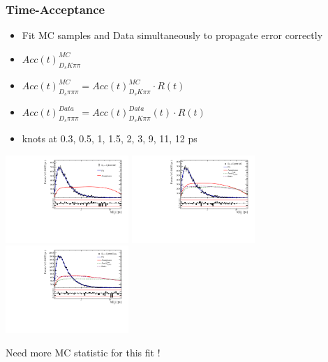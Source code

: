 \documentclass[]{beamer}
\begin{document}
\begin{frame}
\frametitle{Time-Acceptance}

\centering

\begin{itemize}
	\item Fit MC samples and Data simultaneously to propagate error correctly
	\item $Acc(t)_{D_{s}K\pi\pi}^{MC}$
	\item $Acc(t)_{D_{s}\pi\pi\pi}^{MC} = Acc(t)^{MC}_{D_{s}K\pi\pi} \cdot R(t) $
	\item $Acc(t)_{D_{s}\pi\pi\pi}^{Data} = Acc(t)_{D_{s}K\pi\pi}^{Data}(t) \cdot R(t) $
	\item knots at 0.3, 0.5, 1, 1.5, 2, 3, 9, 11, 12 ps
\end{itemize}

\includegraphics[width=0.35\textwidth,height=!]{plots/timeAccRatioFit_signal_mc_alternative.pdf}
\includegraphics[width=0.35\textwidth,height=!]{plots/timeAccRatioFit_norm_mc_alternative.pdf}
\includegraphics[width=0.35\textwidth,height=!]{plots/timeAccRatioFit_norm_alternative.pdf}

Need more MC statistic for this fit !

\end{frame}
\end{document}
